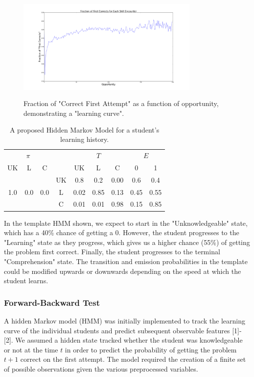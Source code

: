 \documentclass{article} %
\begin{document}
\begin{figure}[h]
\begin{center}
\includegraphics[width=0.8\textwidth]{fracCORR_opp.png}
\label{learning_curve}
\end{center}
\caption{Fraction of "Correct First Attempt" as a function of opportunity, demonstrating a "learning curve".}
\end{figure}


\begin{table}[t]
\begin{center}
\begin{tabular}{ccc|c|ccc|cc}
\multicolumn{3}{c}{$\pi$} && \multicolumn{3}{c}{$T$} & \multicolumn{2}{c}{$E$}\\
UK & L & C & & UK & L & C & 0 & 1\\
& & & UK &0.8 & 0.2 & 0.00  & 0.6 & 0.4\\
1.0 & 0.0 & 0.0 & L & 0.02 & 0.85 & 0.13 & 0.45 & 0.55\\
&&& C & 0.01 & 0.01 & 0.98 & 0.15 & 0.85\\

\end{tabular}
\caption{A proposed Hidden Markov Model for a student's learning history.}\label{HMMprop}
\end{center}
\end{table}

In the template HMM shown, we expect to start in the "Unknowledgeable" state, which has a 40\% chance of getting a 0. However, the student progresses to the "Learning" state as they progress, which gives us a higher chance (55\%) of getting the problem first correct. Finally, the student progresses to the terminal "Comprehension" state. The transition and emission probabilities in the template could be modified upwards or downwards depending on the speed at which the student learns.

\subsubsection{Forward-Backward Test}
A hidden Markov model (HMM) was initially implemented to track the learning curve of the individual students and predict subsequent observable features [1]-[2]. We assumed a hidden state tracked whether the student was knowledgeable or not at the time $t$ in order to predict the probability of getting the problem $t+1$ correct on the first attempt. The model required the creation of a finite set of possible observations given the various preprocessed variables. 
\end{document}
